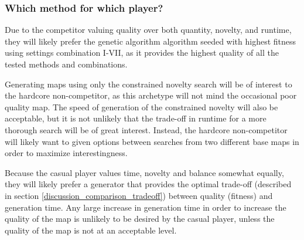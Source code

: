 \subsubsection{Which method for which player?}
Due to the competitor valuing quality over both quantity, novelty, and runtime, they will likely prefer the genetic algorithm algorithm seeded with highest fitness using settings combination I-VII, as it provides the highest quality of all the tested methods and combinations.

Generating maps using only the constrained novelty search will be of interest to the hardcore non-competitor, as this archetype will not mind the occasional poor quality map. The speed of generation of the constrained novelty will also be acceptable, but it is not unlikely that the trade-off in runtime for a more thorough search will be of great interest. Instead, the hardcore non-competitor will likely want to given options between searches from two different base maps in order to maximize interestingness.

Because the casual player values time, novelty and balance somewhat equally, they will likely prefer a generator that provides the optimal trade-off (described in section \ref{discussion_comparison_tradeoff}) between quality (fitness) and generation time. Any large increase in generation time in order to increase the quality of the map is unlikely to be desired by the casual player, unless the quality of the map is not at an acceptable level.